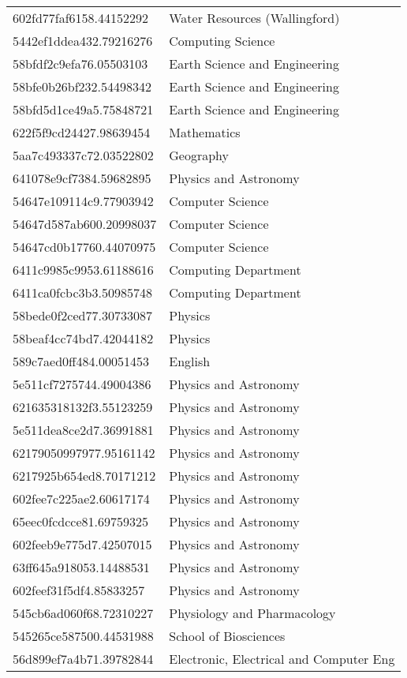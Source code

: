 \begin{tabular}{ll}
602fd77faf6158.44152292 & Water Resources (Wallingford) \\
5442ef1ddea432.79216276 & Computing Science \\
58bfdf2c9efa76.05503103 & Earth Science and Engineering \\
58bfe0b26bf232.54498342 & Earth Science and Engineering \\
58bfd5d1ce49a5.75848721 & Earth Science and Engineering \\
622f5f9cd24427.98639454 & Mathematics \\
5aa7c493337c72.03522802 & Geography \\
641078e9cf7384.59682895 & Physics and Astronomy \\
54647e109114c9.77903942 & Computer Science \\
54647d587ab600.20998037 & Computer Science \\
54647cd0b17760.44070975 & Computer Science \\
6411c9985c9953.61188616 & Computing Department \\
6411ca0fcbc3b3.50985748 & Computing Department \\
58bede0f2ced77.30733087 & Physics \\
58beaf4cc74bd7.42044182 & Physics \\
589c7aed0ff484.00051453 & English \\
5e511cf7275744.49004386 & Physics and Astronomy \\
621635318132f3.55123259 & Physics and Astronomy \\
5e511dea8ce2d7.36991881 & Physics and Astronomy \\
62179050997977.95161142 & Physics and Astronomy \\
6217925b654ed8.70171212 & Physics and Astronomy \\
602fee7c225ae2.60617174 & Physics and Astronomy \\
65eec0fcdcce81.69759325 & Physics and Astronomy \\
602feeb9e775d7.42507015 & Physics and Astronomy \\
63ff645a918053.14488531 & Physics and Astronomy \\
602feef31f5df4.85833257 & Physics and Astronomy \\
545cb6ad060f68.72310227 & Physiology and Pharmacology \\
545265ce587500.44531988 & School of Biosciences \\
56d899ef7a4b71.39782844 & Electronic, Electrical and Computer Eng \\

\end{tabular}
